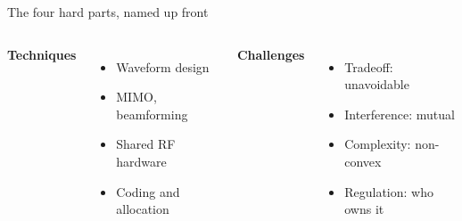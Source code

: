\begin{frame}{The four hard parts, named up front}
  \vspace{0.5em}
  \begin{columns}[T,onlytextwidth]
      \large\textbf{\textcolor{ranblue}{Techniques}}

      \vspace{0.5em}
      \small
      \begin{itemize}\itemsep4pt
        \item Waveform design
        \item MIMO, beamforming
        \item Shared RF hardware
        \item Coding and allocation
      \end{itemize}
      \large\textbf{\textcolor{coreorange}{Challenges}}

      \vspace{0.5em}
      \small
      \begin{itemize}\itemsep4pt
        \item Tradeoff: unavoidable
        \item Interference: mutual
        \item Complexity: non-convex
        \item Regulation: who owns it
      \end{itemize}
  \end{columns}


  \vspace{0.4em}
\end{frame}
